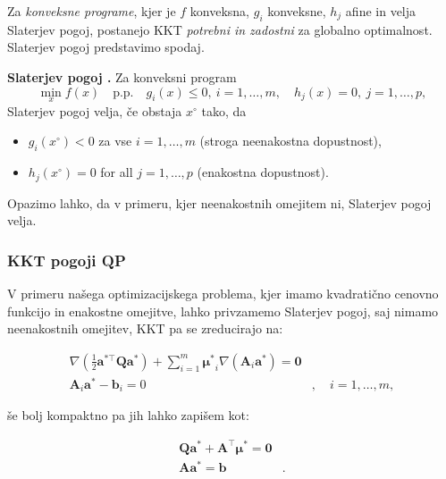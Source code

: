 \documentclass[mat2, tisk]{fmfdelo}
\begin{document}
Za \emph{konveksne programe}, kjer je $f$ konveksna, $g_i$ konveksne, $h_j$ afine in velja Slaterjev pogoj, postanejo \ac{KKT} \emph{potrebni in zadostni} za globalno optimalnost. Slaterjev pogoj predstavimo spodaj.

\textbf{Slaterjev pogoj \cite{bertsekas1997nonlinear,boyd2004convex}.} 
Za konveksni program
\[
\min_x f(x) \quad \text{p.p.} \quad g_i(x) \leq 0, \ i=1,\dots,m, \quad h_j(x) = 0, \ j=1,\dots,p,
\]
Slaterjev pogoj velja, če obstaja $x^\circ$ tako, da
\begin{itemize}
\item $g_i(x^\circ) < 0$ za vse $i=1,\dots,m$ (stroga neenakostna dopustnost),
\item $h_j(x^\circ) = 0$ for all $j=1,\dots,p$ (enakostna dopustnost).
\end{itemize}

Opazimo lahko, da v primeru, kjer neenakostnih omejitem ni, Slaterjev pogoj velja.

\subsubsection{\acs{KKT} pogoji \acs{QP}}

V primeru našega optimizacijskega problema, kjer imamo kvadratično cenovno funkcijo in enakostne omejitve, lahko privzamemo Slaterjev pogoj, saj nimamo neenakostnih omejitev, \ac{KKT} pa se zreducirajo na:

\begin{equation}
    \begin{aligned}
        \nabla (\frac{1}{2}\mathbf{a^{*\top}}\mathbf{Q}\mathbf{a^*}) + \sum_{i=1}^m \mathbf{\mu^*}_i \nabla(\mathbf{A}_i \mathbf{a^*}) = \mathbf{0}& \\
        \mathbf{A}_i \mathbf{a^*} - \mathbf{b}_i = 0&, \quad i = 1,\ldots, m,
    \end{aligned}
\end{equation}

še bolj kompaktno pa jih lahko zapišem kot:

\begin{equation}
    \begin{aligned}
        \mathbf{Q}\mathbf{a^*} + \mathbf{A^\top}\mathbf{\mu^*} = \mathbf{0}& \\
        \mathbf{A} \mathbf{a^*} = \mathbf{b}&.
    \end{aligned}
\end{equation}
\end{document}

